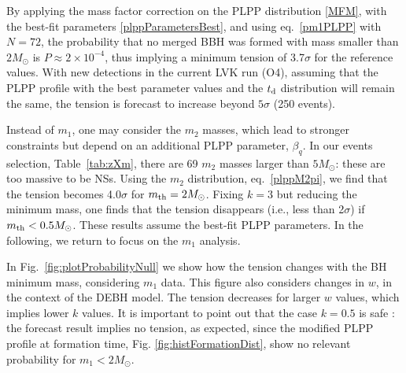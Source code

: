 \documentclass[fleqn,usenatbib,useAMS]{mnras}
\begin{document}
By applying the mass factor correction on the PLPP distribution \eqref{MFM}, with the best-fit parameters \eqref{plppParametersBest}, and using eq.~\eqref{pm1PLPP} with $N=72$, the probability that no merged BBH was formed with mass smaller than $2 M_\odot$ is $P \approx 2 \times 10^{-4}$, thus implying a minimum tension of 3.7$\sigma$ for the reference values. 
With new detections in the current LVK run (O4), assuming that the PLPP profile with the best parameter values and the $t_{\rm d}$ distribution will remain the same, the tension is forecast to increase beyond $5\sigma$ (250 events). 

Instead of $m_1$, one may consider the $m_2$ masses, which lead to stronger constraints but depend on an additional PLPP parameter, $\beta_q$. In our events selection, Table~\ref{tab:zXm}, there are 69 $m_2$ masses larger than $5 M_\odot$: these are too massive to be NSs.  Using the $m_2$ distribution, eq.~\eqref{plppM2pi}, we find that the tension becomes 4.0$\sigma$ for $m_{\rm th} = 2 M_\odot$. Fixing $k=3$ but reducing the minimum mass, one finds that the tension disappears (i.e., less than 2$\sigma$) if $m_{\rm th} < 0.5 M_\odot$. These results assume the best-fit PLPP parameters. In the following, we return to focus on the $m_1$ analysis. 

In Fig.~\ref{fig:plotProbabilityNull} we show how the tension changes with the 
BH minimum mass, considering $m_1$ data. This figure also considers changes in $w$, in the context of the DEBH model. The tension decreases for larger $w$ values, which implies lower $k$ values. It is important to point out that the case $k=0.5$ is safe \citep{Croker:2021duf}: the forecast result implies no tension, as expected, since the modified PLPP profile at formation time, Fig. \ref{fig:histFormationDist}, show no relevant probability for $m_1 < 2 M_\odot$.
\end{document}
